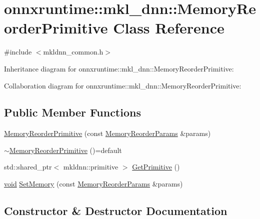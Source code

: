 \hypertarget{classonnxruntime_1_1mkl__dnn_1_1MemoryReorderPrimitive}{}\section{onnxruntime\+:\+:mkl\+\_\+dnn\+:\+:Memory\+Reorder\+Primitive Class Reference}
\label{classonnxruntime_1_1mkl__dnn_1_1MemoryReorderPrimitive}


{\ttfamily \#include $<$mkldnn\+\_\+common.\+h$>$}



Inheritance diagram for onnxruntime\+:\+:mkl\+\_\+dnn\+:\+:Memory\+Reorder\+Primitive\+:


Collaboration diagram for onnxruntime\+:\+:mkl\+\_\+dnn\+:\+:Memory\+Reorder\+Primitive\+:
\subsection*{Public Member Functions}
\begin{DoxyCompactItemize}
\item 
\mbox{\hyperlink{classonnxruntime_1_1mkl__dnn_1_1MemoryReorderPrimitive_a58c6a3179f1f9ef7156b39c4b39f0736}{Memory\+Reorder\+Primitive}} (const \mbox{\hyperlink{structonnxruntime_1_1mkl__dnn_1_1MemoryReorderParams}{Memory\+Reorder\+Params}} \&params)
\item 
\mbox{\hyperlink{classonnxruntime_1_1mkl__dnn_1_1MemoryReorderPrimitive_aa66ca7685504bf8f39c06a72a30bec87}{$\sim$\+Memory\+Reorder\+Primitive}} ()=default
\item 
std\+::shared\+\_\+ptr$<$ mkldnn\+::primitive $>$ \mbox{\hyperlink{classonnxruntime_1_1mkl__dnn_1_1MemoryReorderPrimitive_ae47f7a92532e2ce07328ea26858029cf}{Get\+Primitive}} ()
\item 
\mbox{\hyperlink{mlasi_8h_a88f941d423cb2a819b70a1358982b1a6}{void}} \mbox{\hyperlink{classonnxruntime_1_1mkl__dnn_1_1MemoryReorderPrimitive_a14bfc8f4f82ef8f01f5b2da2e560e57a}{Set\+Memory}} (const \mbox{\hyperlink{structonnxruntime_1_1mkl__dnn_1_1MemoryReorderParams}{Memory\+Reorder\+Params}} \&params)
\end{DoxyCompactItemize}


\subsection{Constructor \& Destructor Documentation}
\mbox{\label{classonnxruntime_1_1mkl__dnn_1_1MemoryReorderPrimitive_a58c6a3179f1f9ef7156b39c4b39f0736}} 
